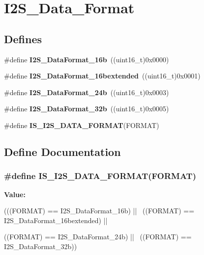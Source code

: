 \hypertarget{group__I2S__Data__Format}{
\section{I2S\_\-Data\_\-Format}
\label{group__I2S__Data__Format}
}
\subsection*{Defines}
\begin{DoxyCompactItemize}
\item 
\hypertarget{group__I2S__Data__Format_gabcd7cb799b68346a735709cc135bd414}{
\#define {\bfseries I2S\_\-DataFormat\_\-16b}~((uint16\_\-t)0x0000)}
\label{group__I2S__Data__Format_gabcd7cb799b68346a735709cc135bd414}

\item 
\hypertarget{group__I2S__Data__Format_gae44b9704c9e393d5abec9bf4fcfe1116}{
\#define {\bfseries I2S\_\-DataFormat\_\-16bextended}~((uint16\_\-t)0x0001)}
\label{group__I2S__Data__Format_gae44b9704c9e393d5abec9bf4fcfe1116}

\item 
\hypertarget{group__I2S__Data__Format_ga5a959486671cf00c5a734f1df205581b}{
\#define {\bfseries I2S\_\-DataFormat\_\-24b}~((uint16\_\-t)0x0003)}
\label{group__I2S__Data__Format_ga5a959486671cf00c5a734f1df205581b}

\item 
\hypertarget{group__I2S__Data__Format_ga6be3bdcc713cb92a9ad247de013a5e37}{
\#define {\bfseries I2S\_\-DataFormat\_\-32b}~((uint16\_\-t)0x0005)}
\label{group__I2S__Data__Format_ga6be3bdcc713cb92a9ad247de013a5e37}

\item 
\#define {\bfseries IS\_\-I2S\_\-DATA\_\-FORMAT}(FORMAT)
\end{DoxyCompactItemize}


\subsection{Define Documentation}
\hypertarget{group__I2S__Data__Format_gac467da829eca4a5c4ce41a6abd2d8e81}{
\subsubsection[{IS\_\-I2S\_\-DATA\_\-FORMAT}]{\setlength{\rightskip}{0pt plus 5cm}\#define IS\_\-I2S\_\-DATA\_\-FORMAT(FORMAT)}}
\label{group__I2S__Data__Format_gac467da829eca4a5c4ce41a6abd2d8e81}
{\bfseries Value:}
\begin{DoxyCode}
(((FORMAT) == I2S_DataFormat_16b) || \
                                    ((FORMAT) == I2S_DataFormat_16bextended) || \
      
                                    ((FORMAT) == I2S_DataFormat_24b) || \
                                    ((FORMAT) == I2S_DataFormat_32b))
\end{DoxyCode}
